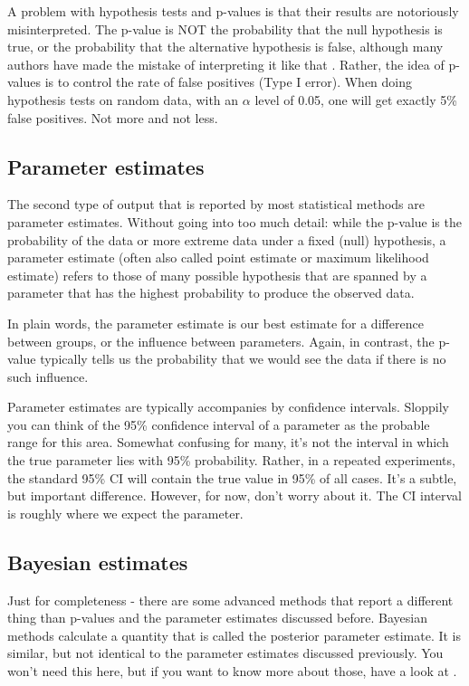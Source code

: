 \documentclass[a4paper,twoside]{tufte-book} %
\begin{document}
A problem with hypothesis tests and p-values is that their results are notoriously misinterpreted. The p-value is NOT the probability that the null hypothesis is true, or the probability that the alternative hypothesis is false, although many authors have made the mistake of interpreting it like that \citep[][]{Cohen-earthisround-1994}. Rather, the idea of p-values is to control the rate of false positives (Type I error). When doing hypothesis tests on random data, with an $\alpha$ level of 0.05, one will get exactly 5\% false positives. Not more and not less.  

\subsection{Parameter estimates}

The second type of output that is reported by most statistical methods are parameter estimates. Without going into too much detail: while the p-value is the probability of the data or more extreme data under a fixed (null) hypothesis, a parameter estimate (often also called point estimate or maximum likelihood estimate) refers to those of many possible hypothesis that are spanned by a parameter that has the highest probability to produce the observed data. 

In plain words, the parameter estimate is our best estimate for a difference between groups, or the influence between parameters. Again, in contrast, the p-value typically tells us the probability that we would see the data if there is no such influence. 

Parameter estimates are typically accompanies by confidence intervals. Sloppily you can think of the 95\% confidence interval of a parameter as the probable range for this area. Somewhat confusing for many, it's not the interval in which the true parameter lies with 95\% probability. Rather, in a repeated experiments, the standard 95\% CI will contain the true value in 95\% of all cases. It's a subtle, but important difference. However, for now, don't worry about it. The CI interval is roughly where we expect the parameter. 

\subsection{Bayesian estimates}

Just for completeness - there are some advanced methods that report a different thing than p-values and the parameter estimates discussed before. Bayesian methods calculate a quantity that is called the posterior parameter estimate. It is similar, but not identical to the parameter estimates discussed previously. You won't need this here, but if you want to know more about those, have a look at \citep{Gelman-BayesianDataAnalysis-2003}.
\end{document}
